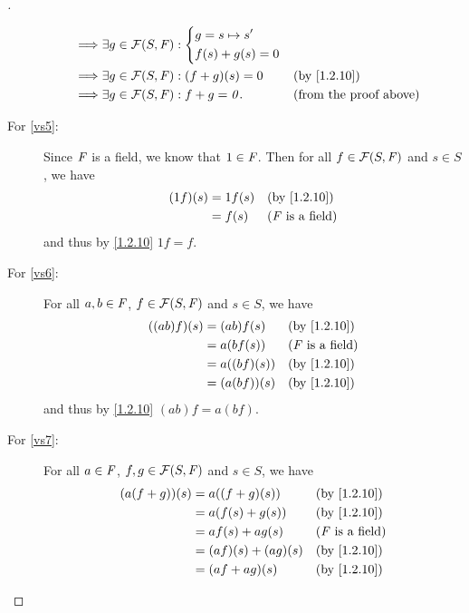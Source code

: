 \begin{proof}[]
\begin{description}
\begin{align*}
				\implies & \exists g \in \FS : \begin{dcases}
					                               g = s \mapsto s' \\
					                               f(s) + g(s) = 0
				                               \end{dcases}                                                  \\
				\implies & \exists g \in \FS : (f + g)(s) = 0                 &  & \text{(by \cref{1.2.10})}     \\
				\implies & \exists g \in \FS : f + g = \zv.                   &  & \text{(from the proof above)}
			\end{align*}
		\item[For \ref{vs5}:]
			Since \(\mathit{F}\) is a field, we know that \(1 \in \mathit{F}\).
			Then for all \(f \in \FS\) and \(s \in S\), we have
			\begin{align*}
				(1f)(s) & = 1f(s) &  & \text{(by \cref{1.2.10})}  \\
				        & = f(s)  &  & \text{(\(\F\) is a field)}
			\end{align*}
			and thus by \cref{1.2.10} \(1f = f\).
		\item[For \ref{vs6}:]
			For all \(a, b \in \mathit{F}\), \(f \in \FS\) and \(s \in S\), we have
			\begin{align*}
				((ab) f)(s) & = (ab) f(s)   &  & \text{(by \cref{1.2.10})}  \\
				            & = a (b f(s))  &  & \text{(\(\F\) is a field)} \\
				            & = a ((bf)(s)) &  & \text{(by \cref{1.2.10})}  \\
				            & = (a (bf))(s) &  & \text{(by \cref{1.2.10})}
			\end{align*}
			and thus by \cref{1.2.10} \((ab) f = a (bf)\).
		\item[For \ref{vs7}:]
			For all \(a \in \mathit{F}\), \(f, g \in \FS\) and \(s \in S\), we have
			\begin{align*}
				(a (f + g))(s) & = a ((f + g)(s))    &  & \text{(by \cref{1.2.10})}  \\
				               & = a (f(s) + g(s))   &  & \text{(by \cref{1.2.10})}  \\
				               & = af(s) + ag(s)     &  & \text{(\(\F\) is a field)} \\
				               & = (af)(s) + (ag)(s) &  & \text{(by \cref{1.2.10})}  \\
				               & = (af + ag)(s)      &  & \text{(by \cref{1.2.10})}

\end{align*}
\end{description}
\end{proof}
